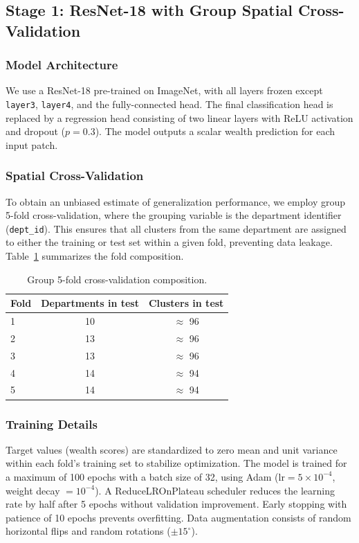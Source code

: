 \documentclass[11pt,a4paper]{article}
\begin{document}
\subsection{Stage 1: ResNet-18 with Group Spatial Cross-Validation}
\label{sec:cnn}

\subsubsection{Model Architecture}
We use a ResNet-18 \citep{he2016} pre-trained on ImageNet, with all layers frozen except \texttt{layer3}, \texttt{layer4}, and the fully-connected head. The final classification head is replaced by a regression head consisting of two linear layers with ReLU activation and dropout ($p = 0.3$). The model outputs a scalar wealth prediction for each input patch.

\subsubsection{Spatial Cross-Validation}
To obtain an unbiased estimate of generalization performance, we employ group 5-fold cross-validation, where the grouping variable is the department identifier (\texttt{dept\_id}). This ensures that all clusters from the same department are assigned to either the training or test set within a given fold, preventing data leakage. Table~\ref{tab:cv_folds} summarizes the fold composition.

\begin{table}[ht]
\centering
\caption{Group 5-fold cross-validation composition.}
\label{tab:cv_folds}
\begin{tabular}{lcc}
\toprule
Fold & Departments in test & Clusters in test \\
\midrule
1 & 10 & $\approx$ 96 \\
2 & 13 & $\approx$ 96 \\
3 & 13 & $\approx$ 96 \\
4 & 14 & $\approx$ 94 \\
5 & 14 & $\approx$ 94 \\
\bottomrule
\end{tabular}
\end{table}

\subsubsection{Training Details}
Target values (wealth scores) are standardized to zero mean and unit variance within each fold's training set to stabilize optimization. The model is trained for a maximum of 100 epochs with a batch size of 32, using Adam ($\text{lr} = 5 \times 10^{-4}$, weight decay $= 10^{-4}$). A ReduceLROnPlateau scheduler reduces the learning rate by half after 5 epochs without validation improvement. Early stopping with patience of 10 epochs prevents overfitting. Data augmentation consists of random horizontal flips and random rotations ($\pm 15^\circ$).
\end{document}
